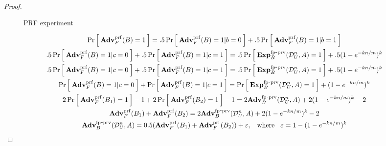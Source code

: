 \begin{proof}
\begin{figure}[h]
\center
{}
\caption{PRF experiment}\label{fig:PRFexp}
\end{figure}
\begin{multline*}
\Prob{\ExpPRF{F}{B} = 1} =   .5\Prob{\ExpPRF{F}{B} = 1 | b =0} + .5\Prob{\ExpPRF{F}{B} = 1 | b = 1}\\
.5\Prob{\ExpPRF{F}{B} = 1|c=0} + .5\Prob{\ExpPRF{F}{B} = 1|c=1}  = .5\Prob{\ExpFPSecHash{B}{\distr{U}{n},A}=1} + .5(1-e^{-kn/m})^k  \\
.5\Prob{\ExpPRF{F}{B} = 1|c=0} + .5\Prob{\ExpPRF{F}{B} = 1|c=1}  = .5\Prob{\ExpFPSecHash{B}{\distr{U}{n},A}=1} + .5(1-e^{-kn/m})^k \\
\Prob{\ExpPRF{F}{B} = 1|c=0} + \Prob{\ExpPRF{F}{B} = 1|c=1} = \Prob{\ExpFPSecHash{B}{\distr{U}{n},A}=1} + (1-e^{-kn/m})^k \\
 2\Prob{\ExpPRF{F}{B_1} = 1} - 1 + 2\Prob{\ExpPRF{F}{B_2} = 1} - 1 = 2\AdvFPSecHash{B}{\distr{U}{n},A} + 2(1-e^{-kn/m})^k -2\\
\AdvPRF{F}{B_1} + \AdvPRF{F}{B_2} = 2\AdvFPSecHash{B}{\distr{U}{n},A} + 2(1-e^{-kn/m})^k -2\\
 \AdvFPSecHash{B}{\distr{U}{n},A} = 0.5(\AdvPRF{F}{B_1} + \AdvPRF{F}{B_2})  + \varepsilon, \nudge \mathrm{where} \nudge \varepsilon = 1-(1-e^{-kn/m})^k
\end{multline*}

\end{proof}


